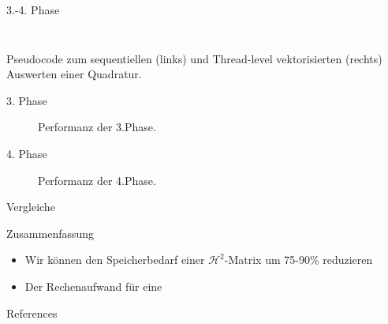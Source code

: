 \documentclass[10pt]{beamer}
\begin{document}
\begin{frame}{3.-4. Phase}
  \begin{columns}
      \begin{algorithm}[H]
        \begin{algorithmic}[1]
          \footnotesize
          {
          \EndFor{}
          }
        \end{algorithmic}
      \end{algorithm}
      \begin{algorithm}[H]
        \begin{algorithmic}[1]
          \footnotesize
          {
            \EndIf{}
          \EndFor{}
          }
        \end{algorithmic}
      \end{algorithm}
  \end{columns}
  \begin{center}
    Pseudocode zum sequentiellen (links) und Thread-level vektorisierten
    (rechts) Auswerten einer Quadratur.
  \end{center}
\end{frame}

\begin{frame}{3. Phase}
  \begin{figure}
    \centering
    \caption{Performanz der 3.Phase.}
  \end{figure}
\end{frame}

\begin{frame}{4. Phase}
  \begin{figure}
    \centering
    \caption{Performanz der 4.Phase.}
  \end{figure}
\end{frame}

\begin{frame}{Vergleiche}

\end{frame}

\begin{frame}{Zusammenfassung}
  \begin{itemize}
    \item Wir können den Speicherbedarf einer \(\mathcal{H}^2\)-Matrix um
          75-90\% reduzieren
    \item Der Rechenaufwand für eine
  \end{itemize}
\end{frame}

\begin{frame}[allowframebreaks]{References}

  
  

\end{frame}
\end{document}

